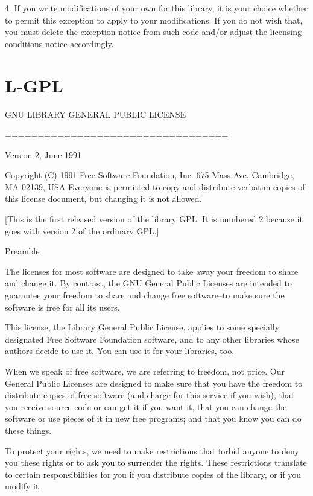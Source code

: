 \documentclass[a4paper,twoside]{tceusermanual}
\begin{document}
4. If you write modifications of your own for this library, it is your
choice whether to permit this exception to apply to your modifications.
If you do not wish that, you must delete the exception notice from such
code and/or adjust the licensing conditions notice accordingly.

\section{L-GPL}

\begin{center}
	  GNU LIBRARY GENERAL PUBLIC LICENSE

	  ==================================

                Version 2, June 1991

 Copyright (C) 1991 Free Software Foundation, Inc.
                    675 Mass Ave, Cambridge, MA 02139, USA
 Everyone is permitted to copy and distribute verbatim copies
 of this license document, but changing it is not allowed.

[This is the first released version of the library GPL.  It is
 numbered 2 because it goes with version 2 of the ordinary GPL.]

Preamble
\end{center}

The licenses for most software are designed to take away your
freedom to share and change it.  By contrast, the GNU General
Public Licenses are intended to guarantee your freedom to share
and change free software--to make sure the software is free for
all its users.

This license, the Library General Public License, applies to
some specially designated Free Software Foundation software, and
to any other libraries whose authors decide to use it.  You can
use it for your libraries, too.

When we speak of free software, we are referring to freedom, not
price.  Our General Public Licenses are designed to make sure
that you have the freedom to distribute copies of free software
(and charge for this service if you wish), that you receive
source code or can get it if you want it, that you can change
the software or use pieces of it in new free programs; and that
you know you can do these things.

To protect your rights, we need to make restrictions that forbid
anyone to deny you these rights or to ask you to surrender the
rights. These restrictions translate to certain responsibilities
for you if you distribute copies of the library, or if you
modify it.
\end{document}
